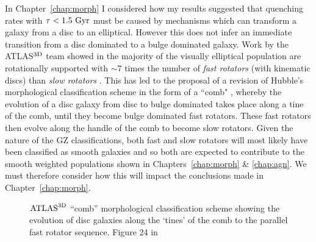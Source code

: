 In Chapter~\ref{chap:morph} I considered how my results suggested that quenching rates with $\tau < 1.5~\rm{Gyr}$ must be caused by mechanisms which can transform a galaxy from a disc to an elliptical. However this does not infer an immediate transition from a disc dominated to a bulge dominated galaxy. Work by the \textsc{ATLAS}$^{\rm{3D}}$ team \citep{cappellari11} showed in the majority of the visually elliptical population are rotationally supported \citep{emsellem11} with $\sim7$ times the number of \emph{fast rotators} (with kinematic discs) than \emph{slow rotators} \citep[with dispersion dominated kinematics see][]{cappellari07, emsellem07}.  This has led to the proposal of a revision of Hubble's morphological classification scheme in the form of a ``comb" \citep[see Figure~\ref{fig:atlascomb} originally from][]{cappellari16}, whereby the evolution of a disc galaxy from disc to bulge dominated takes place along a tine of the comb, until they become bulge dominated fast rotators. These fast rotators then evolve along the handle of the comb to become slow rotators. Given the nature of the GZ classifications, both fast and slow rotators will most likely have been classified as smooth galaxies and so both are expected to contribute to the smooth weighted populations shown in Chapters~\ref{chap:morph} \& \ref{chap:agn}. We must therefore consider how this will impact the conclusions made in Chapter~\ref{chap:morph}. 


\begin{figure}
\caption[$\rm{ATLAS}^{\rm{3D}}$ ``comb'' morphological classification scheme from Cappellari (2016)]{$\rm{ATLAS}^{\rm{3D}}$ ``comb'' morphological classification scheme showing the evolution of disc galaxies along the `tines' of the comb to the parallel fast rotator sequence. Figure 24 in \cite{cappellari16}}
\label{fig:atlascomb}
\end{figure}

